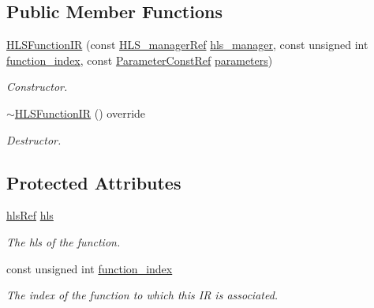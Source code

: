 \subsection*{Public Member Functions}
\begin{DoxyCompactItemize}
\item 
\hyperlink{classHLSFunctionIR_ae001ab763fb04f3ff62c1f8ee8d0a06e}{H\+L\+S\+Function\+IR} (const \hyperlink{hls__manager_8hpp_acd3842b8589fe52c08fc0b2fcc813bfe}{H\+L\+S\+\_\+manager\+Ref} \hyperlink{classHLSIR_a19d757a0d26d351ad3560310b981e2ac}{hls\+\_\+manager}, const unsigned int \hyperlink{classHLSFunctionIR_ae35237f38b8d023319c7a47ad5cf6ea1}{function\+\_\+index}, const \hyperlink{Parameter_8hpp_a37841774a6fcb479b597fdf8955eb4ea}{Parameter\+Const\+Ref} \hyperlink{classIntermediateRepresentation_a1dec82655a3ccf5023a1d3bb9805ce8c}{parameters})
\begin{DoxyCompactList}\small\item\em Constructor. \end{DoxyCompactList}\item 
\hyperlink{classHLSFunctionIR_a9d593cf41a97dea0f5881362c77f5a38}{$\sim$\+H\+L\+S\+Function\+IR} () override
\begin{DoxyCompactList}\small\item\em Destructor. \end{DoxyCompactList}\end{DoxyCompactItemize}
\subsection*{Protected Attributes}
\begin{DoxyCompactItemize}
\item 
\hyperlink{hls_8hpp_a75d0c73923d0ddfa28c4843a802c73a7}{hls\+Ref} \hyperlink{classHLSFunctionIR_a17e8a19b4e2c92ca308238fb5b29ceaa}{hls}
\begin{DoxyCompactList}\small\item\em The hls of the function. \end{DoxyCompactList}\item 
const unsigned int \hyperlink{classHLSFunctionIR_ae35237f38b8d023319c7a47ad5cf6ea1}{function\+\_\+index}
\begin{DoxyCompactList}\small\item\em The index of the function to which this IR is associated. \end{DoxyCompactList}\end{DoxyCompactItemize}


